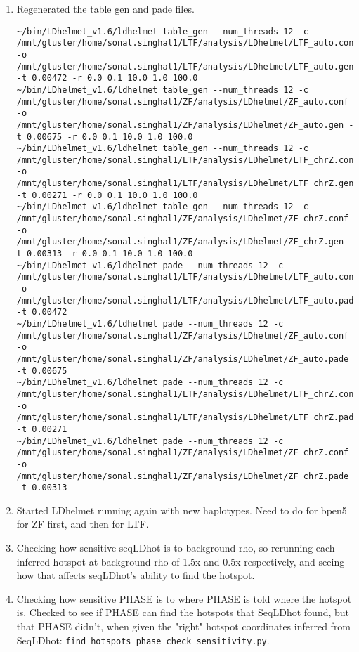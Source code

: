 \documentclass[idxtotoc,hyperref,openany,oneside]{labbook} %
\begin{document}
\begin{enumerate}
\item Regenerated the table gen and pade files.
\begin{verbatim}	
~/bin/LDhelmet_v1.6/ldhelmet table_gen --num_threads 12 -c /mnt/gluster/home/sonal.singhal1/LTF/analysis/LDhelmet/LTF_auto.conf -o /mnt/gluster/home/sonal.singhal1/LTF/analysis/LDhelmet/LTF_auto.gen -t 0.00472 -r 0.0 0.1 10.0 1.0 100.0 
~/bin/LDhelmet_v1.6/ldhelmet table_gen --num_threads 12 -c /mnt/gluster/home/sonal.singhal1/ZF/analysis/LDhelmet/ZF_auto.conf -o /mnt/gluster/home/sonal.singhal1/ZF/analysis/LDhelmet/ZF_auto.gen -t 0.00675 -r 0.0 0.1 10.0 1.0 100.0 
~/bin/LDhelmet_v1.6/ldhelmet table_gen --num_threads 12 -c /mnt/gluster/home/sonal.singhal1/LTF/analysis/LDhelmet/LTF_chrZ.conf -o /mnt/gluster/home/sonal.singhal1/LTF/analysis/LDhelmet/LTF_chrZ.gen -t 0.00271 -r 0.0 0.1 10.0 1.0 100.0 
~/bin/LDhelmet_v1.6/ldhelmet table_gen --num_threads 12 -c /mnt/gluster/home/sonal.singhal1/ZF/analysis/LDhelmet/ZF_chrZ.conf -o /mnt/gluster/home/sonal.singhal1/ZF/analysis/LDhelmet/ZF_chrZ.gen -t 0.00313 -r 0.0 0.1 10.0 1.0 100.0 
~/bin/LDhelmet_v1.6/ldhelmet pade --num_threads 12 -c /mnt/gluster/home/sonal.singhal1/LTF/analysis/LDhelmet/LTF_auto.conf -o /mnt/gluster/home/sonal.singhal1/LTF/analysis/LDhelmet/LTF_auto.pade -t 0.00472
~/bin/LDhelmet_v1.6/ldhelmet pade --num_threads 12 -c /mnt/gluster/home/sonal.singhal1/ZF/analysis/LDhelmet/ZF_auto.conf -o /mnt/gluster/home/sonal.singhal1/ZF/analysis/LDhelmet/ZF_auto.pade -t 0.00675 
~/bin/LDhelmet_v1.6/ldhelmet pade --num_threads 12 -c /mnt/gluster/home/sonal.singhal1/LTF/analysis/LDhelmet/LTF_chrZ.conf -o /mnt/gluster/home/sonal.singhal1/LTF/analysis/LDhelmet/LTF_chrZ.pade -t 0.00271
~/bin/LDhelmet_v1.6/ldhelmet pade --num_threads 12 -c /mnt/gluster/home/sonal.singhal1/ZF/analysis/LDhelmet/ZF_chrZ.conf -o /mnt/gluster/home/sonal.singhal1/ZF/analysis/LDhelmet/ZF_chrZ.pade -t 0.00313 
\end{verbatim}
\item Started LDhelmet running again with new haplotypes. Need to do for bpen5 for ZF first, and then for LTF.
\item Checking how sensitive seqLDhot is to background rho, so rerunning each inferred hotspot at background rho of 1.5x and 0.5x respectively, and seeing how that affects seqLDhot's ability to find the hotspot.
\item Checking how sensitive PHASE is to where PHASE is told where the hotspot is. Checked to see if PHASE can find the hotspots that SeqLDhot found, but that PHASE didn't, when given the "right" hotspot coordinates inferred from SeqLDhot: \verb+find_hotspots_phase_check_sensitivity.py+.

\end{enumerate}
\end{document}
